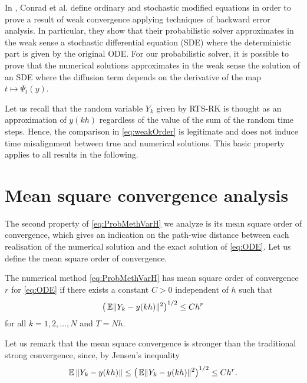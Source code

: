 \documentclass[10pt]{article}
\begin{document}
\begin{remark} In \cite{CGS16}, Conrad et al. define ordinary and stochastic modified equations in order to prove a result of weak convergence applying techniques of backward error analysis. In particular, they show that their probabilistic solver approximates in the weak sense a stochastic differential equation (SDE) where the deterministic part is given by the original ODE. For our probabilistic solver, it is possible to prove that the numerical solutions approximates in the weak sense the solution of an SDE where the diffusion term depends on the derivative of the map $t \mapsto \Psi_t(y)$.
\end{remark}

\begin{remark} Let us recall that the random variable $Y_k$ given by RTS-RK is thought as an approximation of $y(kh)$ regardless of the value of the sum of the random time steps. Hence, the comparison in \eqref{eq:weakOrder} is legitimate and does not induce time misalignment between true and numerical solutions. This basic property applies to all results in the following.
\end{remark}
\section{Mean square convergence analysis}\label{sec:StrongOrder}

The second property of \eqref{eq:ProbMethVarH} we analyze is its mean square order of convergence, which gives an indication on the path-wise distance between each realisation of the numerical solution and the exact solution of \eqref{eq:ODE}. Let us define the mean square order of convergence. 
\begin{definition} The numerical method \eqref{eq:ProbMethVarH} has mean square order of convergence $r$ for \eqref{eq:ODE} if there exists a constant $C > 0$ independent of $h$ such that
	\begin{equation}
	\big(\operatorname{\mathbb{E}}\lVert Y_k - y(kh)\rVert^2\big)^{1/2} \leq Ch^r
	\end{equation}
	for all $k = 1, 2, \ldots, N$ and $T = Nh$.
\end{definition} 
\begin{remark} Let us remark that the mean square convergence is stronger than the traditional strong convergence, since, by Jensen's inequality 
	\begin{equation}
		\operatorname{\mathbb{E}}{\lVert Y_k - y(kh)\rVert} \leq \big(\operatorname{\mathbb{E}}\lVert Y_k - y(kh)\rVert^2\big)^{1/2} \leq Ch^r.
	\end{equation}	
\end{remark}
\end{document}
